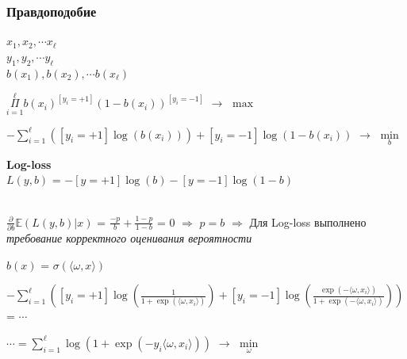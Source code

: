         \subsubsection{Правдоподобие}

        $x_1, x_2, \cdots x_\ell$\\

        $y_1, y_2, \cdots y_\ell$\\

        $b(x_1), b(x_2), \cdots b(x_\ell)$\\

        \begin{center}
            $\Pi\limits_{i = 1}^\ell b(x_i)^{[y_i = +1]}(1 - b(x_i))^{[y_i = -1]}$ $\longrightarrow$ $\max$
        \end{center}

        \begin{center}
            \Large{$-\sum\limits_{i = 1}^\ell([y_i = +1]\log(b(x_i))) + [y_i = -1 ]\log(1 - b(x_i))$ $\longrightarrow$ $\min\limits_b$}
        \end{center}

        \begin{center}
            \large{\textbf{Log-loss}\\

            $L(y, b)$ = $-[y = +1]\log(b) - [y = -1 ]\log(1 - b)$}\\
            
        \end{center}\\

        $\frac{\partial}{\partial b} \mathbb{E}(L(y, b) | x)$ = $\frac{-p}{b} + \frac{1 - p}{1 - b}$ = $0$ $\Longrightarrow$ $p = b$ $\Longrightarrow$ Для Log-loss выполнено \textit{требование корректного оценивания вероятности}\\
        \hline

        $b(x)$ = $\sigma(\langle\omega, x\rangle)$\\

        \begin{center}
            \large{$-\sum\limits_{i = 1}^\ell ([y_i = +1]\log(\frac{1}{1 + \exp(\langle \omega, x_i \rangle)}) + [y_i = -1]\log(\frac{\exp(-\langle \omega, x_i \rangle)}{1 + \exp(-\langle \omega, x_i \rangle)}))$ = $\cdots$}
        \end{center}

        \begin{center}
            \Large{$\cdots = \sum\limits_{i = 1}^\ell\log(1 + \exp(-y_i\langle\omega, x_i\rangle))$ $\longrightarrow$ $\min\limits_\omega$}\\
        \end{center}



